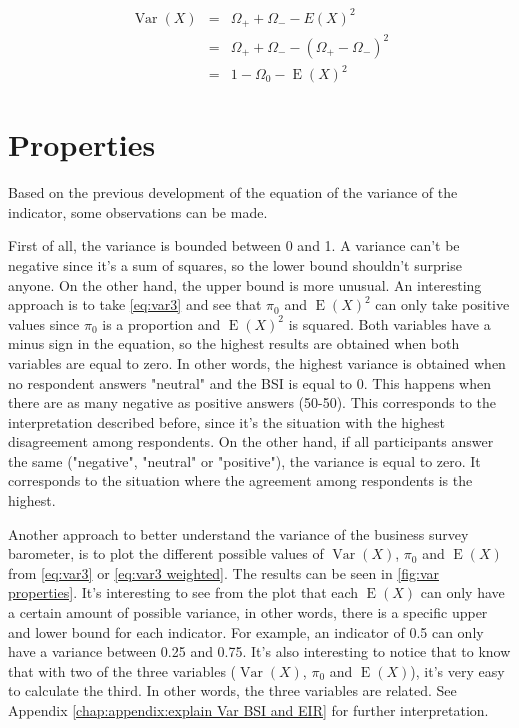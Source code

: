 \documentclass[12pt,a4paper,oneside]{book}
\DeclareMathOperator{\Var}{Var}
\DeclareMathOperator{\E}{E}
\begin{document}
\begin{eqnarray}
\Var(X) &=& \Omega_+ + \Omega_- - E ( X )^2 \\
	&=& \Omega_+ + \Omega_- - ( \Omega_+ - \Omega_- )^2 \\
    &=& 1 - \Omega_{0} - \E(X)^2 \label{eq:var3 weighted}
\end{eqnarray}


\section{Properties}
    \label{sec:properties variance}


Based on the previous development of the equation of the variance of the indicator, some observations can be made.

First of all, the variance is bounded between 0 and 1. 
A variance can't be negative since it's a sum of squares, so the lower bound shouldn't surprise anyone. On the other hand, the upper bound is more unusual. 
An interesting approach is to take \autoref{eq:var3} and see that $\pi_0$ and $\E(X)^2$ can only take positive values since $\pi_0$ is a proportion and $\E(X)^2$ is squared. 
Both variables have a minus sign in the equation, so the highest results are obtained when both variables are equal to zero.
In other words, the highest variance is obtained when no respondent answers "neutral" and the BSI is equal to 0. 
This happens when there are as many negative as positive answers (50-50).
This corresponds to the interpretation described before, since it's the situation with the highest disagreement among respondents.
On the other hand, if all participants answer the same ("negative", "neutral" or "positive"), the variance is equal to zero.
It corresponds to the situation where the agreement among respondents is the highest.

Another approach to better understand the variance of the business survey barometer, is to plot the different possible values of $\Var(X)$, $\pi_0$ and $\E(X)$ from \autoref{eq:var3} or \autoref{eq:var3 weighted}. The results can be seen in \autoref{fig:var properties}.
It's interesting to see from the plot that each $\E(X)$ can only have a certain amount of possible variance, in other words, there is a specific upper and lower bound for each indicator. For example, an indicator of 0.5 can only have a variance between 0.25 and 0.75.
It's also interesting to notice that to know that with two of the three variables ($\Var(X)$, $\pi_0$ and $\E(X)$), it's very easy to calculate the third. 
In other words, the three variables are related. 
See Appendix \autoref{chap:appendix:explain Var BSI and EIR} for further interpretation.
\end{document}

